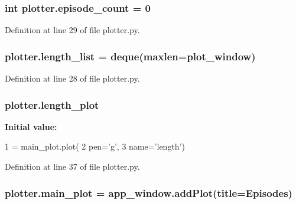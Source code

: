 \subsubsection[{\texorpdfstring{episode\+\_\+count}{episode_count}}]{\setlength{\rightskip}{0pt plus 5cm}int plotter.\+episode\+\_\+count = 0}\hypertarget{namespaceplotter_aec1d6d729c0b25355f045e1f5bdc588f}{}\label{namespaceplotter_aec1d6d729c0b25355f045e1f5bdc588f}


Definition at line 29 of file plotter.\+py.

\subsubsection[{\texorpdfstring{length\+\_\+list}{length_list}}]{\setlength{\rightskip}{0pt plus 5cm}plotter.\+length\+\_\+list = deque(maxlen={\bf plot\+\_\+window})}\hypertarget{namespaceplotter_ab7eba5fc23c3791ab6bca7c5c975d2b8}{}\label{namespaceplotter_ab7eba5fc23c3791ab6bca7c5c975d2b8}


Definition at line 28 of file plotter.\+py.

\subsubsection[{\texorpdfstring{length\+\_\+plot}{length_plot}}]{\setlength{\rightskip}{0pt plus 5cm}plotter.\+length\+\_\+plot}\hypertarget{namespaceplotter_ac0842708a1e94becc6bb776a68a9ac5f}{}\label{namespaceplotter_ac0842708a1e94becc6bb776a68a9ac5f}
{\bfseries Initial value\+:}
\begin{DoxyCode}
1 = main\_plot.plot(
2     pen=\textcolor{stringliteral}{'g'},
3     name=\textcolor{stringliteral}{'length'})
\end{DoxyCode}


Definition at line 37 of file plotter.\+py.

\subsubsection[{\texorpdfstring{main\+\_\+plot}{main_plot}}]{\setlength{\rightskip}{0pt plus 5cm}plotter.\+main\+\_\+plot = app\+\_\+window.\+add\+Plot(title=\textquotesingle{}Episodes\textquotesingle{})}\hypertarget{namespaceplotter_a40d656a97d2e7039f17ee5742490ecf9}{}\label{namespaceplotter_a40d656a97d2e7039f17ee5742490ecf9}



